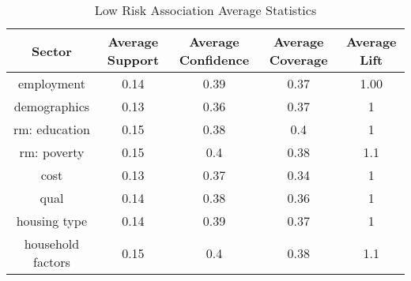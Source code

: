 \begin{table}[h]
    \centering
    \caption{Low Risk Association Average Statistics}
    \label{tab:low_risk_ass} %
    \begin{tabular}{|c|c|c|c|c|}
    \hline
    Sector & Average Support & Average Confidence & Average Coverage & Average Lift \\
    \hline
    employment & 0.14 & 0.39 & 0.37 & 1.00 \\
    \hline
    demographics & 0.13 & 0.36 & 0.37 & 1 \\
    \hline
    rm: education & 0.15 & 0.38 & 0.4 & 1 \\
    \hline
    rm: poverty & 0.15 & 0.4 & 0.38 & 1.1 \\
    \hline
    cost & 0.13 & 0.37 & 0.34 & 1 \\
    \hline
    qual & 0.14 & 0.38 & 0.36 & 1 \\
    \hline
    housing type & 0.14 & 0.39 & 0.37 & 1 \\
    \hline
    household factors & 0.15 & 0.4 & 0.38 & 1.1 \\
    \hline
    \end{tabular}
\end{table}
